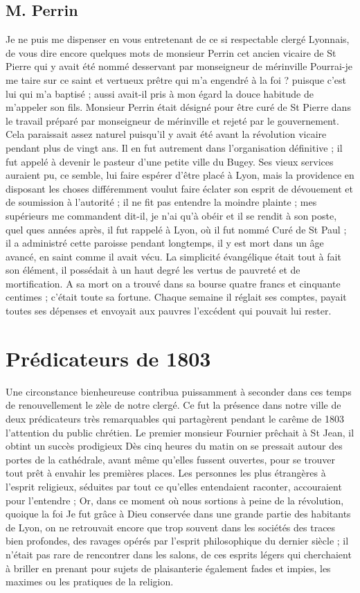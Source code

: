 \documentclass[11pt,a4paper]{report}
\begin{document}
\subsection*{M. Perrin}

Je ne puis me dispenser en vous entretenant de ce si respectable clergé Lyonnais, de vous dire encore quelques mots de monsieur Perrin cet ancien vicaire de St Pierre qui y avait été nommé desservant par monseigneur de mérinville Pourrai-je me taire sur ce saint et vertueux prêtre qui m'a engendré à la foi ? puisque c'est lui qui m'a baptisé ; aussi avait-il pris à mon égard la douce habitude de m'appeler son fils. Monsieur Perrin était désigné pour être curé de St Pierre dans le travail préparé par monseigneur de mérinville et rejeté par le gouvernement. Cela paraissait assez naturel puisqu'il y avait été avant la révolution vicaire pendant plus de vingt ans. Il en fut autrement dans l'organisation définitive ; il fut appelé à devenir le pasteur d'une petite ville du Bugey. Ses vieux services auraient pu, ce semble, lui faire espérer d'être placé à Lyon, mais la providence en disposant les choses différemment voulut faire éclater son esprit de dévouement et de soumission à l'autorité ; il ne fit pas entendre la moindre plainte ; mes supérieurs me commandent dit-il, je n'ai qu'à obéir et il se rendit à son poste, quel ques années après, il fut rappelé à Lyon, où il fut nommé Curé de St Paul ; il a administré cette paroisse pendant longtemps, il y est mort dans un âge avancé, en saint comme il avait vécu. La simplicité évangélique était tout à fait son élément, il possédait à un haut degré les vertus de pauvreté et de mortification. A sa mort on a trouvé dans sa bourse quatre francs et cinquante centimes ; c'était toute sa fortune. Chaque semaine il réglait ses comptes, payait toutes ses dépenses et envoyait aux pauvres l'excédent qui pouvait lui rester.

\section*{Prédicateurs de 1803}

Une circonstance bienheureuse contribua puissamment à seconder dans ces temps de renouvellement le zèle de notre clergé. Ce fut la présence dans notre ville de deux prédicateurs très remarquables qui partagèrent pendant le carême de 1803 l'attention du public chrétien. Le premier monsieur Fournier prêchait à St Jean, il obtint un succès prodigieux Dès cinq heures du matin on se pressait autour des portes de la cathédrale, avant même qu'elles fussent ouvertes, pour se trouver tout prêt à envahir les premières places. Les personnes les plus étrangères à l'esprit religieux, séduites par tout ce qu'elles entendaient raconter, accouraient pour l'entendre ; Or, dans ce moment où nous sortions à peine de la révolution, quoique la foi Je fut grâce à Dieu conservée dans une grande partie des habitants de Lyon, on ne retrouvait encore que trop souvent dans les sociétés des traces bien profondes, des ravages opérés par l'esprit philosophique du dernier siècle ; il n'était pas rare de rencontrer dans les salons, de ces esprits légers qui cherchaient à briller en prenant pour sujets de plaisanterie également fades et impies, les maximes ou les pratiques de la religion.
\end{document}
